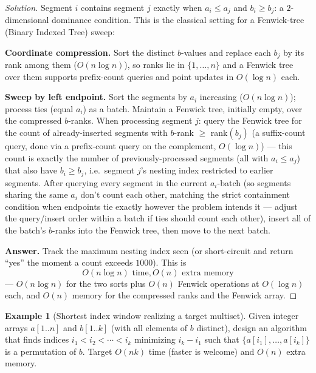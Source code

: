 \documentclass[11pt]{article}
\theoremstyle{definition}
\newtheorem{example}{Example}[section]
\begin{document}
\begin{proof}[Solution]
Segment $i$ contains segment $j$ exactly when $a_i\le a_j$ and $b_i\ge b_j$: a $2$-dimensional dominance condition. This is the classical setting for a Fenwick-tree (Binary Indexed Tree) sweep:

\textbf{Coordinate compression.} Sort the distinct $b$-values and replace each $b_j$ by its rank among them ($O(n\log n)$), so ranks lie in $\{1,\dots,n\}$ and a Fenwick tree over them supports prefix-count queries and point updates in $O(\log n)$ each.

\textbf{Sweep by left endpoint.} Sort the segments by $a_i$ increasing ($O(n\log n)$); process ties (equal $a_i$) as a batch. Maintain a Fenwick tree, initially empty, over the compressed $b$-ranks. When processing segment $j$: query the Fenwick tree for the count of already-inserted segments with $b$-rank $\ge$ rank$(b_j)$ (a suffix-count query, done via a prefix-count query on the complement, $O(\log n)$) — this count is exactly the number of previously-processed segments (all with $a_i\le a_j$) that also have $b_i\ge b_j$, i.e.\ segment $j$'s nesting index restricted to earlier segments. After querying every segment in the current $a_i$-batch (so segments sharing the same $a_i$ don't count each other, matching the strict containment condition when endpoints tie exactly however the problem intends it — adjust the query/insert order within a batch if ties should count each other), insert all of the batch's $b$-ranks into the Fenwick tree, then move to the next batch.

\textbf{Answer.} Track the maximum nesting index seen (or short-circuit and return ``yes'' the moment a count exceeds $1000$). This is
\[
\boxed{O(n\log n) \text{ time}, O(n) \text{ extra memory}}
\]
— $O(n\log n)$ for the two sorts plus $O(n)$ Fenwick operations at $O(\log n)$ each, and $O(n)$ memory for the compressed ranks and the Fenwick array.
\end{proof}

\begin{example}[Shortest index window realizing a target multiset]
Given integer arrays $a[1..n]$ and $b[1..k]$ (with all elements of $b$ distinct), design an algorithm that finds indices $i_1<i_2<\cdots<i_k$ minimizing $i_k-i_1$ such that $\{a[i_1],\dots,a[i_k]\}$ is a permutation of $b$. Target $O(nk)$ time (faster is welcome) and $O(n)$ extra memory.
\end{example}
\end{document}
